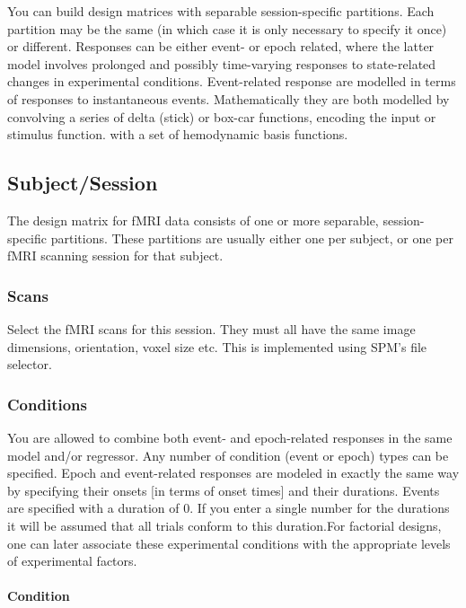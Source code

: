 You can build design matrices with separable session-specific partitions.  Each partition may be the same (in which case it is only necessary to specify it once) or different.  Responses can be either event- or epoch related, where the latter model involves prolonged and possibly time-varying responses to state-related changes in experimental conditions.  Event-related response are modelled in terms of responses to instantaneous events.  Mathematically they are both modelled by convolving a series of delta (stick) or box-car functions, encoding the input or stimulus function. with a set of hemodynamic basis functions.

\subsection{Subject/Session}

The design matrix for fMRI data consists of one or more separable, session-specific partitions.  These partitions are usually either one per subject, or one per fMRI scanning session for that subject.

\subsubsection{Scans}

Select the fMRI scans for this session.  They must all have the same image dimensions, orientation, voxel size etc. This is implemented using SPM's file selector.

\subsubsection{Conditions}

You are allowed to combine both event- and epoch-related responses in the same model and/or regressor. Any number of condition (event or epoch) types can be specified.  Epoch and event-related responses are modeled in exactly the same way by specifying their onsets [in terms of onset times] and their durations.  Events are specified with a duration of 0.  If you enter a single number for the durations it will be assumed that all trials conform to this duration.For factorial designs, one can later associate these experimental conditions with the appropriate levels of experimental factors. 

\paragraph{Condition}

